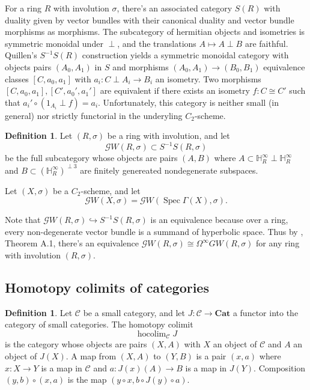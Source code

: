 \documentclass[draftthesis,tocnosub,noragright,centerchapter,10pt]{uiucthesis2009}
\newcommand{\mbb}{\mathbb}
\newcommand{\mc}{\mathcal}
\newcommand{\Cat}{\mathbf{Cat}}
\DeclareMathOperator{\Spec}{Spec}
\DeclareMathOperator*{\hocolim}{hocolim}
\theoremstyle{plain}
\theoremstyle{definition}
\newtheorem{definition}[lemma]{Definition}
\begin{document}
For a ring $R$ with involution $\sigma$, there's an associated
category $S(R)$ with duality given by vector bundles
with their canonical duality and vector bundle morphisms as
morphisms. The subcategory of hermitian objects and isometries is symmetric monoidal under $\perp$, and the translations
$A \mapsto A \perp B$ are faithful. Quillen's $S^{-1}S(R)$ construction
yields a symmetric monoidal category with objects pairs $(A_0,A_1)$ in
$S$ and morphisms $(A_0,A_1) \rightarrow (B_0,B_1)$ equivalence
classes $[C,a_0,a_1]$ with $a_i : C \perp A_i \rightarrow B_i$ an
isometry. Two morphisms $[C,a_0,a_1], [C',a_0',a_1']$ are equivalent
if there exists an isometry $f : C \cong C'$ such that $a_i'\circ
(1_{A_i} \perp f) = a_i$. Unfortunately, this category is neither
small (in general) nor strictly functorial in
the underyling $C_2$-scheme. 

\begin{definition}
Let $(R,\sigma)$ be a ring with involution, and let
\[
\mathscr GW(R,\sigma) \subset S^{-1}S(R,\sigma)
\]
be the full subcategory whose objects are pairs $(A,B)$ where $A
\subset \mbb H^\infty_R \perp \mbb H^\infty_R$ and $B \subset (\mbb
H^\infty_R)^{\perp 3}$ are finitely genereated nondegenerate
subspaces. 

Let $(X,\sigma)$ be a $C_2$-scheme, and let
\[
\mathscr GW(X,\sigma) = \mathscr GW(\Spec \Gamma(X),\sigma).
\]
\end{definition}

Note that $\mathscr GW(R,\sigma) \hookrightarrow S^{-1}S(R,\sigma)$ is
an equivalence because over a ring, every non-degenerate vector bundle
is a summand of hyperbolic space. Thus by \cite{Schder}, Theorem A.1, there's an equivalence
$\mathscr GW(R,\sigma) \cong \Omega^\infty GW(R,\sigma)$ for any ring
with involution $(R,\sigma)$. 

\subsection*{Homotopy colimits of categories}

\begin{definition}
Let $\mc C$ be a small category, and let $J : \mc C \rightarrow \Cat$
a functor into the category of small categories. The homotopy colimit
\[
\hocolim_{\mc C} J
\]
is the category whose objects are pairs $(X,A)$ with $X$ an object of
$\mc C$ and $A$ an object of $J(X)$. A map from $(X,A)$ to $(Y,B)$ is
a pair $(x,a)$ where $x : X \rightarrow Y$ is a map in $\mc C$ and $a
: J(x)(A) \rightarrow B$ is a map in $J(Y)$. Composition $(y,b) \circ
(x,a)$ is the map $(y \circ x, b \circ J(y) \circ a)$. 
\end{definition}
\end{document}
